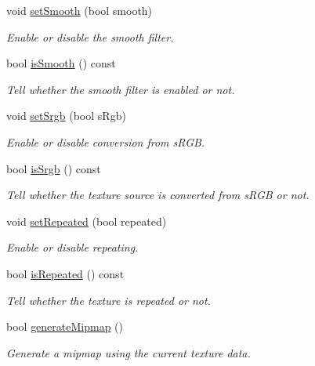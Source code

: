\begin{DoxyCompactItemize}
void \mbox{\hyperlink{classsf_1_1_texture_a0c3bd6825b9a99714f10d44179d74324}{set\+Smooth}} (bool smooth)
\begin{DoxyCompactList}\small\item\em Enable or disable the smooth filter. \end{DoxyCompactList}\item 
bool \mbox{\hyperlink{classsf_1_1_texture_a3ebb050b5a71e1d40ba66eb1a060e103}{is\+Smooth}} () const
\begin{DoxyCompactList}\small\item\em Tell whether the smooth filter is enabled or not. \end{DoxyCompactList}\item 
void \mbox{\hyperlink{classsf_1_1_texture_af8a38872c50a33ff074bd0865db19dd4}{set\+Srgb}} (bool s\+Rgb)
\begin{DoxyCompactList}\small\item\em Enable or disable conversion from s\+R\+GB. \end{DoxyCompactList}\item 
bool \mbox{\hyperlink{classsf_1_1_texture_a9d77ce4f8124abfda96900a6bd53bfe9}{is\+Srgb}} () const
\begin{DoxyCompactList}\small\item\em Tell whether the texture source is converted from s\+R\+GB or not. \end{DoxyCompactList}\item 
void \mbox{\hyperlink{classsf_1_1_texture_aaa87d1eff053b9d4d34a24c784a28658}{set\+Repeated}} (bool repeated)
\begin{DoxyCompactList}\small\item\em Enable or disable repeating. \end{DoxyCompactList}\item 
bool \mbox{\hyperlink{classsf_1_1_texture_af1a1a32ca5c799204b2bea4040df7647}{is\+Repeated}} () const
\begin{DoxyCompactList}\small\item\em Tell whether the texture is repeated or not. \end{DoxyCompactList}\item 
bool \mbox{\hyperlink{classsf_1_1_texture_a7779a75c0324b5faff77602f871710a9}{generate\+Mipmap}} ()
\begin{DoxyCompactList}\small\item\em Generate a mipmap using the current texture data. \end{DoxyCompactList}\item 

\end{DoxyCompactItemize}
